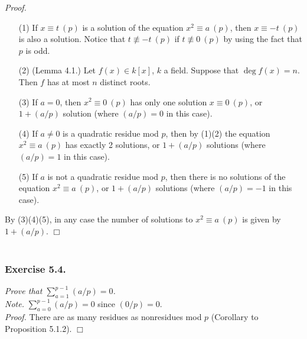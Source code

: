 \documentclass{article}
\begin{document}
\emph{Proof.}
\begin{enumerate}
\item[(1)]
If $x \equiv t \: (p)$ is a solution of the equation $x^2 \equiv a \: (p)$,
then $x \equiv -t \: (p)$ is also a solution.
Notice that $t \not\equiv -t \: (p)$ if $t \not\equiv 0 \: (p)$
by using the fact that $p$ is odd.
\item[(2)]
(Lemma 4.1.) Let $f(x) \in k[x]$, $k$ a field. Suppose that $\deg f(x) = n$.
Then $f$ has at most $n$ distinct roots.
\item[(3)]
If $a = 0$, then $x^2 \equiv 0 \: (p)$ has only one solution $x \equiv 0 \: (p)$,
or $1 + (a/p)$ solution (where $(a/p) = 0$ in this case).
\item[(4)]
If $a \neq 0$ is a quadratic residue mod $p$, then by (1)(2)
the equation $x^2 \equiv a \: (p)$ has exactly 2 solutions, or $1 + (a/p)$ solutions
(where $(a/p) = 1$ in this case).
\item[(5)]
If $a$ is not a quadratic residue mod $p$,
then there is no solutions of the equation $x^2 \equiv a \: (p)$,
or $1 + (a/p)$ solutions (where $(a/p) = -1$ in this case).
\end{enumerate}
By (3)(4)(5), in any case the number of solutions to $x^2 \equiv a \: (p)$
is given by $1 + (a/p)$.
$\Box$ \\\\






\subsubsection*{Exercise 5.4.}
\emph{Prove that $\sum_{a=1}^{p-1} (a/p) = 0$.} \\

\emph{Note.}
$\sum_{a=0}^{p-1} (a/p) = 0$ since $(0/p) = 0$. \\

\emph{Proof.}
There are as many residues as nonresidues mod $p$ (Corollary to Proposition 5.1.2).
$\Box$ \\\\



\end{document}
